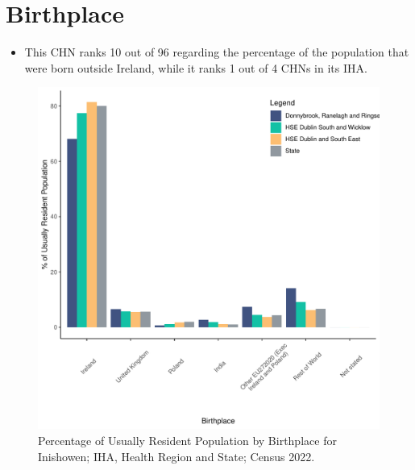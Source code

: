 \documentclass{article}
\begin{document}
\section{Birthplace}\label{sect:Birth}
\begin{itemize}
\item This CHN ranks  10 out of 96 regarding the percentage of the population that were born outside Ireland, while it ranks  1 out of 4 CHNs in its IHA.
\end{itemize}
\begin{figure}[H]
	\centering
	\includegraphics[width = 130mm]{../figures/BirthED.pdf}
	\caption{Percentage of Usually Resident Population by Birthplace for Inishowen; IHA, Health Region and State; Census 2022.}
	\label{fig:vbnv}
	\end{figure}
	
\end{document}
